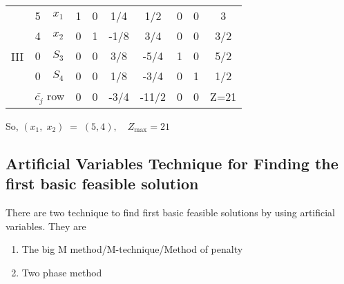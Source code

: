 \documentclass[../main-sheet.tex]{subfiles}
\begin{document}
\begin{soln}
\begin{table}[H]
\begin{tabular}{cccccccccc}
            \midrule
            \multirow{5}[4]{*}{III} & 5                                     & $x_1$                                          & 1                                  & 0                                    & 1/4                                 & 1/2                              & 0                                & 0                                & 3         \\
                                    & 4                                     & $ x_2$                                         & 0                                  & 1                                    & -1/8                                & 3/4                              & 0                                & 0                                & 3/2       \\
                                    & 0                                     & $S_3$                                          & 0                                  & 0                                    & 3/8                                 & -5/4                             & 1                                & 0                                & 5/2       \\
                                    & 0                                     & $S_4$                                          & 0                                  & 0                                    & 1/8                                 & -3/4                             & 0                                & 1                                & 1/2       \\
            \cmidrule{2-10}         & \multicolumn{2}{c}{$ \bar{c_j} $ row} & 0                                              & 0                                  & -3/4                                 & -11/2                               & 0                                & 0                                & Z=21                                         \\
            \bottomrule
        \end{tabular}
    \end{table}
    So, \((x_1,\;x_2)\;=\;(5,4),\quad Z_{\text{max}}=21\)
\end{soln}
\subsection{Artificial Variables Technique for Finding the first basic feasible solution}
There are two technique to find first basic feasible solutions by using artificial variables. They are
\begin{enumerate}[label=(\roman*)]
    \item The big M method/M-technique/Method of penalty
    \item Two phase method
\end{enumerate}
\end{document}
